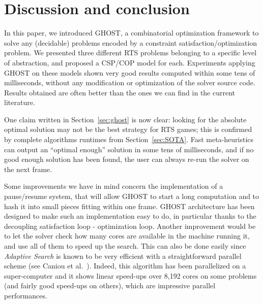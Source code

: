 \documentclass[journal]{IEEEtran}
\newcommand{\minormod}[1]{#1 \xspace}
\newcommand{\csp}{\textsc{CSP}\xspace}
\newcommand{\cop}{\textsc{COP}\xspace}
\newcommand{\ghost}{\textsc{GHOST}\xspace}
\begin{document}
\section{Discussion and conclusion}\label{sec:conclusion}

In this paper, we introduced \ghost, a combinatorial optimization
framework to solve any \minormod{(decidable)} problems encoded by a constraint
satisfaction/optimization problem.  We presented three different RTS
problems belonging to a specific level of abstraction, and proposed a
\csp/\cop model for each. Experiments applying \ghost on these models
shown very good results computed within some tens of milliseconds,
without any modification or optimization of the solver source
code. Results obtained are often better than the ones we can find in
the current literature.

One claim written in Section~\ref{sec:ghost} is now clear: looking for
the absolute  optimal solution may  not be  the best strategy  for RTS
games; this is confirmed by complete algorithms runtimes from Section~\ref{sec:SOTA}.  Fast  meta-heuristics  can  output an  ``optimal
enough'' solution in some tens of  milliseconds, and if no good enough
solution has been found, the user can always re-run the solver on the
next frame.   %


Some  improvements we  have in  mind concern the implementation  of a
pause/resume system, that will allow  \ghost to start a  long computation and
to hash it into small pieces fitting  within one frame. %
\ghost architecture has been designed to make such an implementation
easy to do, in particular thanks to the decoupling satisfaction loop -
optimization loop. Another improvement would be to let the solver
check how many cores are available in the machine running it, and use
all of them to speed up the search. This can also be done easily since
{\it Adaptive Search} is known to be very efficient with a
straightforward parallel scheme (see Caniou et
al.~\cite{Caniou14}). Indeed, this algorithm has been parallelized on a
super-computer and it shows linear speed-ups over 8,192 cores on some
problems (and fairly good speed-ups on others), which are impressive
parallel performances.
\end{document}
